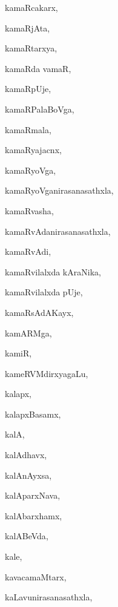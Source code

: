 \begin{multicols}{3}
{\noindent
{kamaRcakarx}, \pageref{kamaRcakarx}

\noindent
{kamaRjAta}, \pageref{kamaRjAta}

\noindent
{kamaRtarxya}, \pageref{kamaRtarxya}

\noindent
{kamaRda vamaR}, \pageref{kamaRda vamaR}

\noindent
{kamaRpUje}, \pageref{kamaRpUje}

\noindent
{kamaRPalaBoVga}, \pageref{kamaRPalaBoVga}

\noindent
{kamaRmala}, \pageref{kamaRmala}

\noindent
{kamaRyajacnx}, \pageref{kamaRyajacnx}

\noindent
{kamaRyoVga}, \pageref{kamaRyoVga}

\noindent
{kamaRyoVganirasanasathxla}, \pageref{kamaRyoVganirasanasathxla}

\noindent
{kamaRvasha}, \pageref{kamaRvasha}

\noindent
{kamaRvAdanirasanasathxla}, \pageref{kamaRvAdanirasanasathxla}

\noindent
{kamaRvAdi}, \pageref{kamaRvAdi}

\noindent
{kamaRvilalxda kAraNika}, \pageref{kamaRvilalxda kAraNika}

\noindent
{kamaRvilalxda pUje}, \pageref{kamaRvilalxda pUje}

\noindent
{kamaRsAdAKayx}, \pageref{kamaRsAdAKayx}

\noindent
{kamARMga}, \pageref{kamARMga}

\noindent
{kamiR}, \pageref{kamiR}

\noindent
{kameRVMdirxyagaLu}, \pageref{kameRVMdirxyagaLu}

\noindent
{kalapx}, \pageref{kalapx}

\noindent
{kalapxBasamx}, \pageref{kalapxBasamx}

\noindent
{kalA}, \pageref{kalA}

\noindent
{kalAdhavx}, \pageref{kalAdhavx}

\noindent
{kalAnAyxsa}, \pageref{kalAnAyxsa}

\noindent
{kalAparxNava}, \pageref{kalAparxNava}

\noindent
{kalAbarxhamx}, \pageref{kalAbarxhamx}

\noindent
{kalABeVda}, \pageref{kalABeVda}

\noindent
{kale}, \pageref{kale}

\noindent
{kavacamaMtarx}, \pageref{kavacamaMtarx}

\noindent
{kaLavunirasanasathxla}, \pageref{kaLavunirasanasathxla}

}
\end{multicols}
